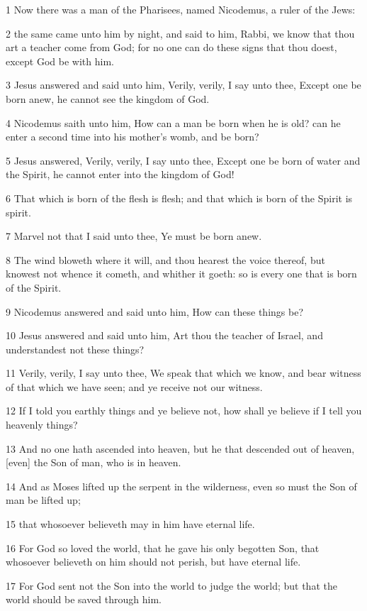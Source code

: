 \par 1 Now there was a man of the Pharisees, named Nicodemus, a ruler of the Jews:
\par 2 the same came unto him by night, and said to him, Rabbi, we know that thou art a teacher come from God; for no one can do these signs that thou doest, except God be with him.
\par 3 Jesus answered and said unto him, Verily, verily, I say unto thee, Except one be born anew, he cannot see the kingdom of God.
\par 4 Nicodemus saith unto him, How can a man be born when he is old? can he enter a second time into his mother's womb, and be born?
\par 5 Jesus answered, Verily, verily, I say unto thee, Except one be born of water and the Spirit, he cannot enter into the kingdom of God!
\par 6 That which is born of the flesh is flesh; and that which is born of the Spirit is spirit.
\par 7 Marvel not that I said unto thee, Ye must be born anew.
\par 8 The wind bloweth where it will, and thou hearest the voice thereof, but knowest not whence it cometh, and whither it goeth: so is every one that is born of the Spirit.
\par 9 Nicodemus answered and said unto him, How can these things be?
\par 10 Jesus answered and said unto him, Art thou the teacher of Israel, and understandest not these things?
\par 11 Verily, verily, I say unto thee, We speak that which we know, and bear witness of that which we have seen; and ye receive not our witness.
\par 12 If I told you earthly things and ye believe not, how shall ye believe if I tell you heavenly things?
\par 13 And no one hath ascended into heaven, but he that descended out of heaven, [even] the Son of man, who is in heaven.
\par 14 And as Moses lifted up the serpent in the wilderness, even so must the Son of man be lifted up;
\par 15 that whosoever believeth may in him have eternal life.
\par 16 For God so loved the world, that he gave his only begotten Son, that whosoever believeth on him should not perish, but have eternal life.
\par 17 For God sent not the Son into the world to judge the world; but that the world should be saved through him.
